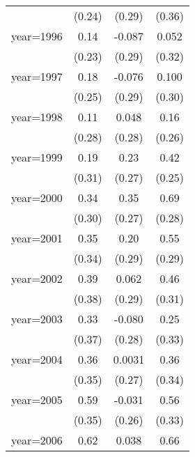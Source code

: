\begin{table}[htbp]
\begin{tabular}{l*{3}{c}}
                &   (0.24)         &   (0.29)         &   (0.36)         \\
\addlinespace
year=1996       &     0.14         &   -0.087         &    0.052         \\
                &   (0.23)         &   (0.29)         &   (0.32)         \\
\addlinespace
year=1997       &     0.18         &   -0.076         &    0.100         \\
                &   (0.25)         &   (0.29)         &   (0.30)         \\
\addlinespace
year=1998       &     0.11         &    0.048         &     0.16         \\
                &   (0.28)         &   (0.28)         &   (0.26)         \\
\addlinespace
year=1999       &     0.19         &     0.23         &     0.42         \\
                &   (0.31)         &   (0.27)         &   (0.25)         \\
\addlinespace
year=2000       &     0.34         &     0.35         &     0.69\sym{*}  \\
                &   (0.30)         &   (0.27)         &   (0.28)         \\
\addlinespace
year=2001       &     0.35         &     0.20         &     0.55         \\
                &   (0.34)         &   (0.29)         &   (0.29)         \\
\addlinespace
year=2002       &     0.39         &    0.062         &     0.46         \\
                &   (0.38)         &   (0.29)         &   (0.31)         \\
\addlinespace
year=2003       &     0.33         &   -0.080         &     0.25         \\
                &   (0.37)         &   (0.28)         &   (0.33)         \\
\addlinespace
year=2004       &     0.36         &   0.0031         &     0.36         \\
                &   (0.35)         &   (0.27)         &   (0.34)         \\
\addlinespace
year=2005       &     0.59         &   -0.031         &     0.56         \\
                &   (0.35)         &   (0.26)         &   (0.33)         \\
\addlinespace
year=2006       &     0.62         &    0.038         &     0.66\sym{*}  \\

\end{tabular}
\end{table}
